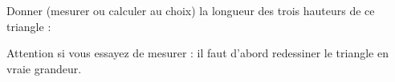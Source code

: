
\begin{exercice}\label{exosmath-0927}

    Donner (mesurer ou calculer au choix) la longueur des trois hauteurs de ce triangle :
\begin{center}
   
\end{center}
Attention si vous essayez de mesurer : il faut d'abord redessiner le triangle en vraie grandeur.


\end{exercice}
